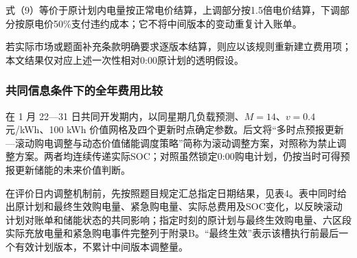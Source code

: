 \documentclass[zihao=-4,a4paper,UTF8,fontset=none]{ctexart}
\begin{document}
式（9）等价于原计划内电量按正常电价结算，上调部分按1.5倍电价结算，下调部分按原电价50\%支付违约成本；它不将中间版本的变动重复计入账单。

若实际市场或题面补充条款明确要求逐版本结算，则应以该规则重新建立费用项；本文结果仅对应上述一次性相对0:00原计划的透明假设。

\subsubsection{共同信息条件下的全年费用比较}\label{ux5171ux540cux4fe1ux606fux6761ux4ef6ux4e0bux7684ux5168ux5e74ux8d39ux7528ux6bd4ux8f83}

在 1 月 22---31 日共同开发期内，以同星期几负载预测、\(M=14\)、\(v=0.4\) 元/kWh、100 kWh 价值网格及四个更新时点确定参数。后文将``多时点预报更新---滚动购电调整与动态价值储能调度策略''简称为滚动调整方案，对照称为禁止调整方案。两者均连续传递实际SOC；对照虽然锁定0:00购电计划，仍按当时可得预报更新储能的未来价值判断。

在评价日内调整机制前，先按照题目规定汇总指定日期结果，见表4。表中同时给出原计划和最终生效购电量、紧急购电量、实际总费用及SOC变化，以反映滚动计划对账单和储能状态的共同影响；指定时刻的原计划与最终生效购电量、六区段实际充放电量和紧急购电事件完整列于附录B。``最终生效''表示该槽执行前最后一个有效计划版本，不累计中间版本调整量。
\end{document}
